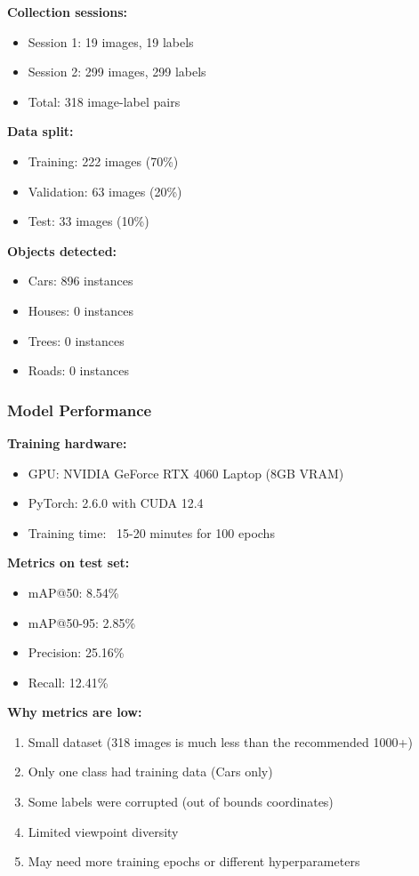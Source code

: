 \textbf{Collection sessions:}
\begin{itemize}
	\item Session 1: 19 images, 19 labels
	\item Session 2: 299 images, 299 labels
	\item Total: 318 image-label pairs
\end{itemize}

\textbf{Data split:}
\begin{itemize}
	\item Training: 222 images (70\%)
	\item Validation: 63 images (20\%)
	\item Test: 33 images (10\%)
\end{itemize}

\textbf{Objects detected:}
\begin{itemize}
	\item Cars: 896 instances
	\item Houses: 0 instances
	\item Trees: 0 instances
	\item Roads: 0 instances
\end{itemize}

\subsubsection{Model Performance}

\textbf{Training hardware:}
\begin{itemize}
	\item GPU: NVIDIA GeForce RTX 4060 Laptop (8GB VRAM)
	\item PyTorch: 2.6.0 with CUDA 12.4
	\item Training time: ~15-20 minutes for 100 epochs
\end{itemize}

\textbf{Metrics on test set:}
\begin{itemize}
	\item mAP@50: 8.54\%
	\item mAP@50-95: 2.85\%
	\item Precision: 25.16\%
	\item Recall: 12.41\%
\end{itemize}

\textbf{Why metrics are low:}
\begin{enumerate}
	\item Small dataset (318 images is much less than the recommended 1000+)
	\item Only one class had training data (Cars only)
	\item Some labels were corrupted (out of bounds coordinates)
	\item Limited viewpoint diversity
	\item May need more training epochs or different hyperparameters
\end{enumerate}

